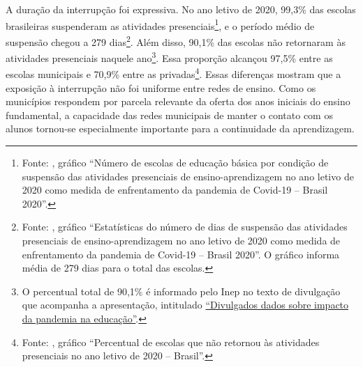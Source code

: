 \documentclass[
	12pt,				%
	openright,			%
	oneside,			%
	a4paper,			%
	brazil,				%
	]{article}
\begin{document}
A duração da interrupção foi expressiva. No ano letivo de 2020, 99,3\% das
escolas brasileiras suspenderam as atividades
presenciais\footnote{Fonte: \textcite[4]{INEP2021_Covid19CensoEscolar2020},
gráfico ``Número de escolas de educação básica por condição de suspensão das
atividades presenciais de ensino-aprendizagem no ano letivo de 2020 como medida
de enfrentamento da pandemia de Covid-19 -- Brasil 2020''.}, e o período médio
de suspensão chegou a 279
dias\footnote{Fonte: \textcite[6]{INEP2021_Covid19CensoEscolar2020}, gráfico
``Estatísticas do número de dias de suspensão das atividades presenciais de
ensino-aprendizagem no ano letivo de 2020 como medida de enfrentamento da
pandemia de Covid-19 -- Brasil 2020''. O gráfico informa média de 279 dias para
o total das escolas.}. Além disso, 90,1\% das escolas não retornaram às
atividades presenciais naquele
ano\footnote{O percentual total de 90,1\% é informado pelo Inep no texto de
divulgação que acompanha a apresentação, intitulado
\href{https://www.gov.br/inep/pt-br/centrais-de-conteudo/noticias/censo-escolar/divulgados-dados-sobre-impacto-da-pandemia-na-educacao}{``Divulgados dados sobre impacto da pandemia na educação''}.}.
Essa proporção alcançou 97,5\% entre as escolas municipais e 70,9\% entre as
privadas\footnote{Fonte: \textcite[7]{INEP2021_Covid19CensoEscolar2020},
gráfico ``Percentual de escolas que não retornou às atividades presenciais no
ano letivo de 2020 -- Brasil''.}. Essas diferenças mostram que a
exposição à interrupção não foi uniforme entre redes de ensino. Como os
municípios respondem por parcela relevante da oferta dos anos iniciais do ensino
fundamental, a capacidade das redes municipais de manter o contato com os alunos
tornou-se especialmente importante para a continuidade da aprendizagem.
\end{document}
